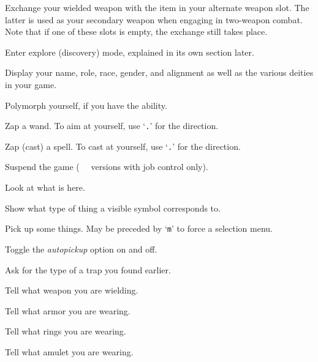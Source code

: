 \item[\tb{{\rm x}}]
Exchange your wielded weapon with the item in your alternate
weapon slot.  The latter is used as your secondary weapon when engaging in
two-weapon combat.  Note that if one of these slots is empty,
the exchange still takes place.

\item[\tb{{\rm X}}]
Enter explore (discovery) mode, explained in its own section later.

\item[\tb{\^{}{\rm X}}]
Display your name, role, race, gender, and alignment as well as
the various deities in your game.

\item[\tb{\^{}{\rm Y}}]
Polymorph yourself, if you have the ability.

\item[\tb{{\rm z}}]
Zap a wand.  To aim at yourself, use `{\tt .}' for the direction.

\item[\tb{{\rm Z}}]
Zap (cast) a spell.  To cast at yourself, use `{\tt .}' for the direction.

\item[\tb{\^{}{\rm Z}}]
Suspend the game
(\UNIX\  versions with job control only).

\item[\tb{:}]
Look at what is here.

\item[\tb{;}]
Show what type of thing a visible symbol corresponds to.

\item[\tb{,}]
Pick up some things. May be preceded by `{\tt m}' to force a selection menu.

\item[\tb{@}]
Toggle the
{\it autopickup\/} 
option on and off.

\item[\tb{\^{}}]
Ask for the type of a trap you found earlier.

\item[\tb{)}]
Tell what weapon you are wielding.

\item[\tb{[}]
Tell what armor you are wearing.

\item[\tb{=}]
Tell what rings you are wearing.

\item[\tb{"}]
Tell what amulet you are wearing.

